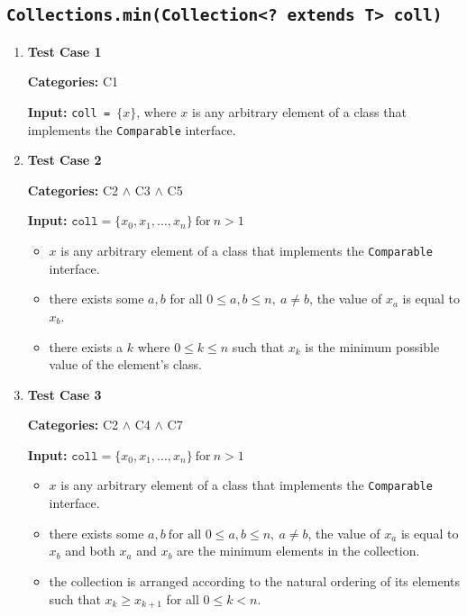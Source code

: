 \documentclass[12pt, a4paper]{article}
\begin{document}
\subsection{\texttt{Collections.min(Collection<? extends T> coll)}}
\begin{enumerate}
  \item \textbf{Test Case 1}
  \par\quad\textbf{Categories:} C1
  \par\quad\textbf{Input:} \texttt{coll = $\{x\}$}, where $x$ is any arbitrary element of a class
  that implements the \texttt{Comparable} interface.

  \item \textbf{Test Case 2}
  \par\quad\textbf{Categories:} C2 $\wedge$ C3 $\wedge$ C5
  \par\quad\textbf{Input:} $\texttt{coll} = \{x_0, x_1, \dots, x_n\}\ \text{for}\ n > 1$
  \begin{itemize}
    \item $x$ is any arbitrary element of a class that implements the \texttt{Comparable} interface.
    \item there exists some $a, b$ for all $0 \leq a,b \leq n,\  a \neq b$, the value of $x_a$ is
    equal to $x_b$.
    \item there exists a $k$ where $0 \leq k \leq n$ such that $x_k$ is the minimum possible value
    of the element's class.
  \end{itemize}

  \item \textbf{Test Case 3}
  \par\quad\textbf{Categories:} C2 $\wedge$ C4 $\wedge$ C7
  \par\quad\textbf{Input:} $\texttt{coll} = \{x_0, x_1, \dots, x_n\}\ \text{for}\ n > 1$
  \begin{itemize}
    \item $x$ is any arbitrary element of a class that implements the \texttt{Comparable} interface.
    \item there exists some $a, b\ \text{for all } 0 \leq a,b \leq n,\  a \neq b$, the value of
    $x_a$ is equal to $x_b$ and both $x_a$ and $x_b$ are the minimum elements in the collection.
    \item the collection is arranged according to the natural ordering \cite{java_natural_order} of
    its elements such that $x_k \geq x_{k+1}$ for all $0 \leq k < n$.
  \end{itemize}
\end{enumerate}
\end{document}
